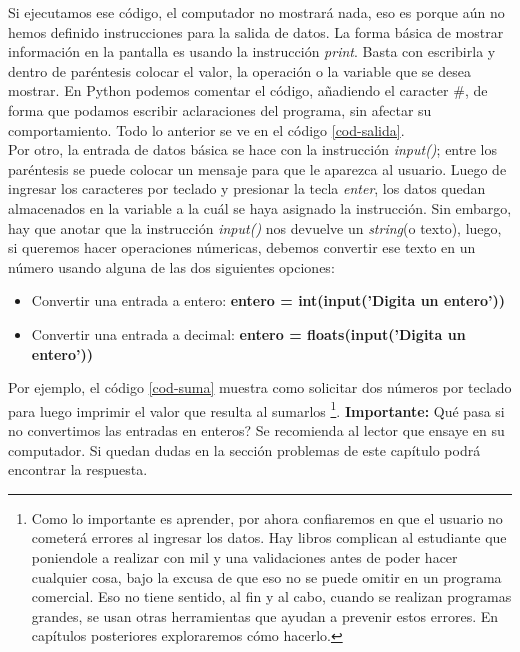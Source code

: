 \newpage



Si ejecutamos ese código, el computador no mostrará nada, eso es porque aún no hemos definido instrucciones para la salida de datos. La forma básica de mostrar información en la pantalla es usando la instrucción \emph{print}. Basta con escribirla y dentro de paréntesis colocar el valor, la operación o la variable que se desea mostrar. En Python podemos comentar el código, añadiendo el caracter \#, de forma que podamos escribir aclaraciones del programa, sin afectar su comportamiento. Todo lo anterior se ve en el código \ref{cod-salida}. \\




Por otro, la entrada de datos básica se hace con la instrucción \emph{input()}; entre los paréntesis se puede colocar un mensaje para que le aparezca al usuario. Luego de ingresar los caracteres por teclado y presionar la tecla \emph{enter}, los datos quedan almacenados en la variable a la cuál se haya asignado la instrucción. Sin embargo, hay que anotar que la instrucción \emph{input()} nos devuelve un \emph{string}(o texto), luego, si queremos hacer operaciones númericas, debemos convertir ese texto en un número usando alguna de las dos siguientes opciones:

\begin{itemize}
 \item Convertir una entrada a entero: \textbf{entero = int(input('Digita un entero'))}
 \item Convertir una entrada a decimal: \textbf{entero = floats(input('Digita un entero'))}
\end{itemize}

 Por ejemplo, el código \ref{cod-suma} muestra como solicitar dos números por teclado para luego imprimir el valor que resulta al sumarlos \footnote{Como lo importante es aprender, por ahora confiaremos en que el usuario no cometerá errores al ingresar los datos. Hay libros complican al estudiante que poniendole a realizar con mil y una validaciones antes de poder hacer cualquier cosa, bajo la excusa de que eso no se puede omitir en un programa comercial. Eso no tiene sentido, al fin y al cabo, cuando se realizan programas grandes, se usan otras herramientas que ayudan a prevenir estos errores. En capítulos posteriores exploraremos cómo hacerlo.}. \textbf{Importante:} Qué pasa si no convertimos las entradas en enteros? Se recomienda al lector que ensaye en su computador. Si quedan dudas en la sección problemas de este capítulo podrá encontrar la respuesta. \\

